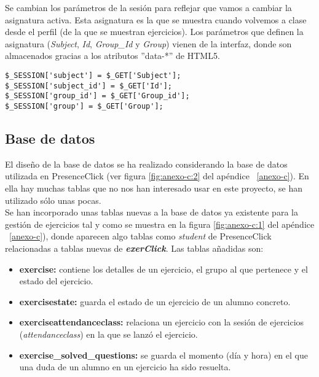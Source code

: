 Se cambian los parámetros de la sesión para reflejar que vamos a cambiar la asignatura activa. Esta asignatura es la que se muestra cuando volvemos a clase desde el perfil (de la que se muestran ejercicios). Los parámetros que definen la asignatura (\textit{Subject}, \textit{Id}, \textit{Group\_Id} y \textit{Group}) vienen de la interfaz, donde son almacenados gracias a los atributos ''data-*'' de HTML5.\\

\noindent
\begin{lstlisting}[caption=Cambiar la asignatura activa.,label={lst:cambiar-asignatura}]
$_SESSION['subject'] = $_GET['Subject'];
$_SESSION['subject_id'] = $_GET['Id'];
$_SESSION['group_id'] = $_GET['Group_id'];
$_SESSION['group'] = $_GET['Group'];
\end{lstlisting}

\subsection{Base de datos}
\label{diseno-e-implementacion:logica-negocio:bd}

El diseño de la base de datos se ha realizado considerando la base de datos utilizada en PresenceClick (ver figura \ref{fig:anexo-c:2} del apéndice ~\ref{anexo-c}). En ella hay muchas tablas que no nos han interesado usar en este proyecto, se han utilizado sólo unas pocas.\\

Se han incorporado unas tablas nuevas a la base de datos ya existente para la gestión de ejercicios tal y como se muestra en la figura \ref{fig:anexo-c:1} del apéndice ~\ref{anexo-c}), donde aparecen algo tablas como \textit{student} de PresenceClick relacionadas a tablas nuevas de \textit{\textbf{exerClick}}. Las tablas añadidas son:

\begin{itemize}
\item \textbf{exercise:} contiene los detalles de un ejercicio, el grupo al que pertenece y el estado del ejercicio.
\item \textbf{exercisestate:} guarda el estado de un ejercicio de un alumno concreto.
\item \textbf{exerciseattendanceclass:} relaciona un ejercicio con la sesión de ejercicios (\textit{attendanceclass}) en la que se lanzó el ejercicio.
\item \textbf{exercise\_solved\_questions:} se guarda el momento (día y hora) en el que una duda de un alumno en un ejercicio ha sido resuelta.
\end{itemize}

